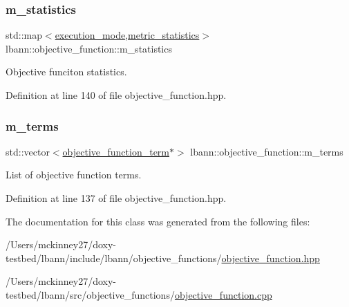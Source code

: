 \mbox{\label{classlbann_1_1objective__function_ad5daa18c52374a849c6fbd515bcc1eb1}} 
\subsubsection{\texorpdfstring{m\+\_\+statistics}{m\_statistics}}
{\footnotesize\ttfamily std\+::map$<$\hyperlink{base_8hpp_a2781a159088df64ed7d47cc91c4dc0a8}{execution\+\_\+mode},\hyperlink{structlbann_1_1metric__statistics}{metric\+\_\+statistics}$>$ lbann\+::objective\+\_\+function\+::m\+\_\+statistics\hspace{0.3cm}{\ttfamily [private]}}

Objective funciton statistics. 

Definition at line 140 of file objective\+\_\+function.\+hpp.

\mbox{\label{classlbann_1_1objective__function_aea9c1f90ba9af1b1330efa2ba6adb5e2}} 
\subsubsection{\texorpdfstring{m\+\_\+terms}{m\_terms}}
{\footnotesize\ttfamily std\+::vector$<$\hyperlink{classlbann_1_1objective__function__term}{objective\+\_\+function\+\_\+term}$\ast$$>$ lbann\+::objective\+\_\+function\+::m\+\_\+terms\hspace{0.3cm}{\ttfamily [private]}}

List of objective function terms. 

Definition at line 137 of file objective\+\_\+function.\+hpp.



The documentation for this class was generated from the following files\+:\begin{DoxyCompactItemize}
\item 
/\+Users/mckinney27/doxy-\/testbed/lbann/include/lbann/objective\+\_\+functions/\hyperlink{objective__function_8hpp}{objective\+\_\+function.\+hpp}\item 
/\+Users/mckinney27/doxy-\/testbed/lbann/src/objective\+\_\+functions/\hyperlink{objective__function_8cpp}{objective\+\_\+function.\+cpp}\end{DoxyCompactItemize}
